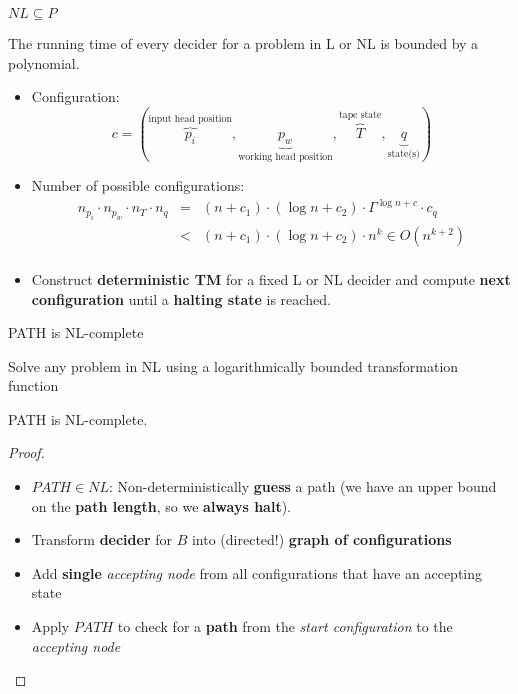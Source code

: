 \begin{frame}{$NL \subseteq P$}

\begin{theorem}
The running time of every decider for a problem in L or NL is bounded by a polynomial.
\end{theorem}

\begin{itemize}
\item Configuration:
    \[
        c = (\overbrace{p_i}^{\text{input head position}}, \underbrace{p_w}_{\text{working head position}}, \overbrace{T}^{\text{tape state}}, \underbrace{q}_{\text{state(s)}})
    \]
\item Number of possible configurations:
$$
\begin{array}{rcl}
n_{p_i} \cdot n_{p_w} \cdot n_T \cdot n_q & = & (n + c_1) \cdot (\log n + c_2) \cdot \Gamma^{\log n + c} \cdot c_q \\
                                          & < & (n + c_1) \cdot (\log n + c_2) \cdot n^k \in O(n^{k+2}) \\
\end{array}
$$
\item Construct \textbf{deterministic TM} for a fixed L or NL decider and compute \textbf{next configuration} until
        a \textbf{halting state} is reached.
\end{itemize}

\end{frame}

\begin{frame}{PATH is NL-complete}

\begin{description}
\itemsep1pt\parskip0pt
\item[\textbf{NL-completeness:}]
Solve any problem in NL using a logarithmically bounded transformation
function
\end{description}

\begin{theorem}
    PATH is NL-complete. \cite{DBLP:books/daglib/0094933}
\end{theorem}

\begin{proof}
\begin{itemize}
    \item $PATH \in NL$: Non-deterministically \textbf{guess} a path (we have an upper bound on the \textbf{path length}, so we \textbf{always halt}).
    \item Transform \textbf{decider} for $B$ into (directed!) \textbf{graph of configurations}
    \item Add \textbf{single} \textit{accepting node} from all configurations that have an accepting state
    \item Apply $PATH$ to check for a \textbf{path} from the \textit{start configuration} to the \textit{accepting node}
\end{itemize}
\end{proof}

\end{frame}

